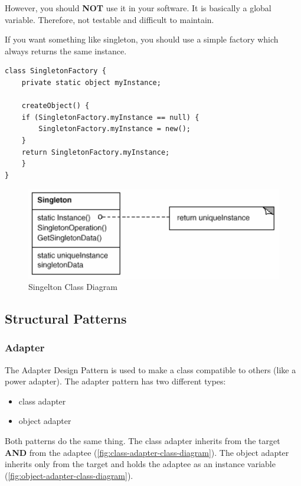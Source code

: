 \documentclass[11pt]{article}
\begin{document}
However, you should \textbf{NOT} use it in your software.
It is basically a global variable.
Therefore, not testable and difficult to maintain.

If you want something like singleton, you should use a simple factory which always returns the same instance.


\begin{lstlisting}
class SingletonFactory {
    private static object myInstance;

    createObject() {
	if (SingletonFactory.myInstance == null) {
	    SingletonFactory.myInstance = new();
	}
	return SingletonFactory.myInstance;
    }
}
\end{lstlisting}

\begin{figure}[htbp]
\centering
\includegraphics[width=.9\linewidth]{img/singleton.png}
\caption{\label{fig:singelton-class-diagram}Singelton Class Diagram}
\end{figure}

\subsection{Structural Patterns}
\label{sec:orgd0f184a}
\subsubsection{Adapter}
\label{sec:orgc2244a8}
The Adapter Design Pattern is used to make a class compatible to others (like a power adapter).
The adapter pattern has two different types:
\begin{itemize}
\item class adapter
\item object adapter
\end{itemize}


Both patterns do the same thing.
The class adapter inherits from the target \textbf{AND} from the adaptee (\ref{fig:class-adapter-class-diagram}).
The object adapter inherits only from the target and holds the adaptee as an instance variable (\ref{fig:object-adapter-class-diagram}).
\end{document}
